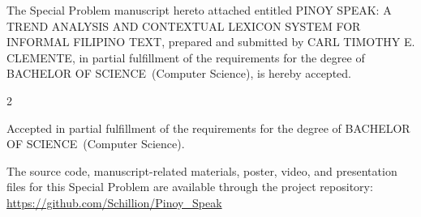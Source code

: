 \documentclass{icsthesis}
\renewcommand{\TITLE}{PINOY SPEAK: A TREND ANALYSIS AND CONTEXTUAL LEXICON SYSTEM FOR INFORMAL FILIPINO TEXT}
\renewcommand{\AUTHOR}{CARL TIMOTHY E. CLEMENTE}
\renewcommand{\DEGREE}{BACHELOR OF SCIENCE}
\renewcommand{\MAJOR}{Computer Science}
\begin{document}
\frenchspacing
\pagestyle{plain}

\begin{frontmatter}


\maketitle


\begin{approvalpage}

The Special Problem manuscript hereto attached entitled \TITLE, prepared and submitted by \AUTHOR, in partial fulfillment of the requirements for the degree of \DEGREE\ (\MAJOR), is hereby accepted.

\vspace{1.25em}

\begin{multicols}{2}

\centering


\columnbreak


\end{multicols}

\vspace{1.25em}


\vspace{1.25em}

Accepted in partial fulfillment of the requirements for the degree of \DEGREE\ (\MAJOR).

\vspace{1.25em}


\vspace{0.75em}

{\small
The source code, manuscript-related materials, poster, video, and presentation files for this Special Problem are available through the project repository: \url{https://github.com/Schillion/Pinoy_Speak}
}


\end{approvalpage}
\end{frontmatter}
\end{document}
